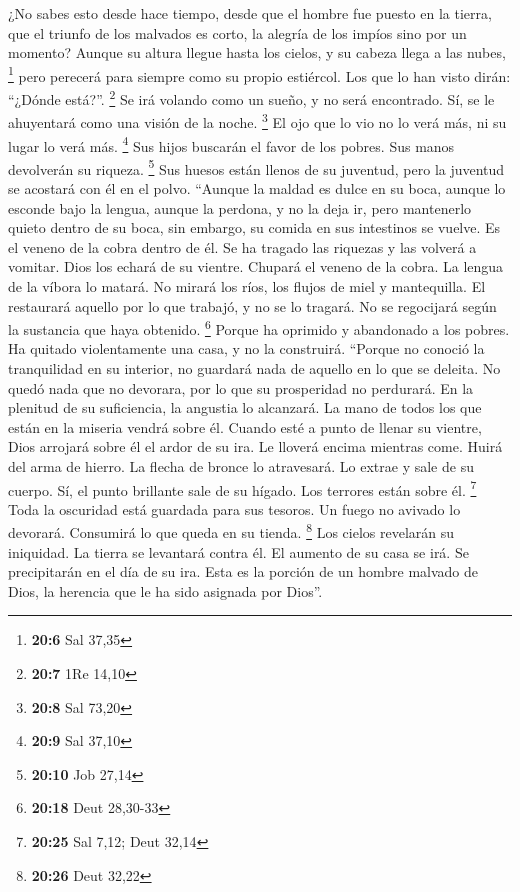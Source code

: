 \begin{paracol}{2}
 ¿No sabes esto desde hace tiempo, desde que el hombre fue
puesto en la tierra,  que el triunfo de los malvados es
corto, la alegría de los impíos sino por un momento? 
Aunque su altura llegue hasta los cielos, y su cabeza llega a las nubes,
\footnote{\textbf{20:6} Sal 37,35}  pero perecerá para
siempre como su propio estiércol. Los que lo han visto dirán: ``¿Dónde
está?''. \footnote{\textbf{20:7} 1Re 14,10}  Se irá
volando como un sueño, y no será encontrado. Sí, se le ahuyentará como
una visión de la noche. \footnote{\textbf{20:8} Sal 73,20}
 El ojo que lo vio no lo verá más, ni su lugar lo verá
más. \footnote{\textbf{20:9} Sal 37,10}  Sus hijos
buscarán el favor de los pobres. Sus manos devolverán su riqueza.
\footnote{\textbf{20:10} Job 27,14}  Sus huesos están
llenos de su juventud, pero la juventud se acostará con él en el polvo.
 ``Aunque la maldad es dulce en su boca, aunque lo
esconde bajo la lengua,  aunque la perdona, y no la deja
ir, pero mantenerlo quieto dentro de su boca,  sin
embargo, su comida en sus intestinos se vuelve. Es el veneno de la cobra
dentro de él.  Se ha tragado las riquezas y las volverá a
vomitar. Dios los echará de su vientre.  Chupará el
veneno de la cobra. La lengua de la víbora lo matará.  No
mirará los ríos, los flujos de miel y mantequilla.  El
restaurará aquello por lo que trabajó, y no se lo tragará. No se
regocijará según la sustancia que haya obtenido. \footnote{\textbf{20:18}
  Deut 28,30-33}  Porque ha oprimido y abandonado a los
pobres. Ha quitado violentamente una casa, y no la construirá.
 ``Porque no conoció la tranquilidad en su interior, no
guardará nada de aquello en lo que se deleita.  No quedó
nada que no devorara, por lo que su prosperidad no perdurará.
 En la plenitud de su suficiencia, la angustia lo
alcanzará. La mano de todos los que están en la miseria vendrá sobre él.
 Cuando esté a punto de llenar su vientre, Dios arrojará
sobre él el ardor de su ira. Le lloverá encima mientras come.
 Huirá del arma de hierro. La flecha de bronce lo
atravesará.  Lo extrae y sale de su cuerpo. Sí, el punto
brillante sale de su hígado. Los terrores están sobre él. \footnote{\textbf{20:25}
  Sal 7,12; Deut 32,14}  Toda la oscuridad está guardada
para sus tesoros. Un fuego no avivado lo devorará. Consumirá lo que
queda en su tienda. \footnote{\textbf{20:26} Deut 32,22} 
Los cielos revelarán su iniquidad. La tierra se levantará contra él.
 El aumento de su casa se irá. Se precipitarán en el día
de su ira.  Esta es la porción de un hombre malvado de
Dios, la herencia que le ha sido asignada por Dios''.


\end{paracol}
